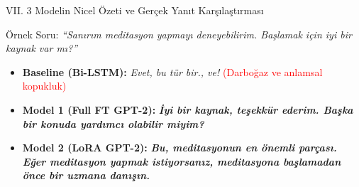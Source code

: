 \documentclass[aspectratio=169,10pt]{beamer}
\begin{document}
\begin{frame}{VII. 3 Modelin Nicel Özeti ve Gerçek Yanıt Karşılaştırması}
    \begin{table}
        \centering
    \end{table}
    \vspace{-4pt}
    \begin{block}{Örnek Soru: \textit{``Sanırım meditasyon yapmayı deneyebilirim. Başlamak için iyi bir kaynak var mı?''}}
        \begin{itemize}
            \item \textbf{Baseline (Bi-LSTM):} \textit{Evet, bu tür bir., ve!} \textcolor{red}{(Darboğaz ve anlamsal kopukluk)}
            \item \textbf{Model 1 (Full FT GPT-2):} \textbf{\textit{İyi bir kaynak, teşekkür ederim. Başka bir konuda yardımcı olabilir miyim?}}
            \item \textbf{Model 2 (LoRA GPT-2):} \textbf{\textit{Bu, meditasyonun en önemli parçası. Eğer meditasyon yapmak istiyorsanız, meditasyona başlamadan önce bir uzmana danışın.}}
        \end{itemize}
    \end{block}
\end{frame}
\end{document}
